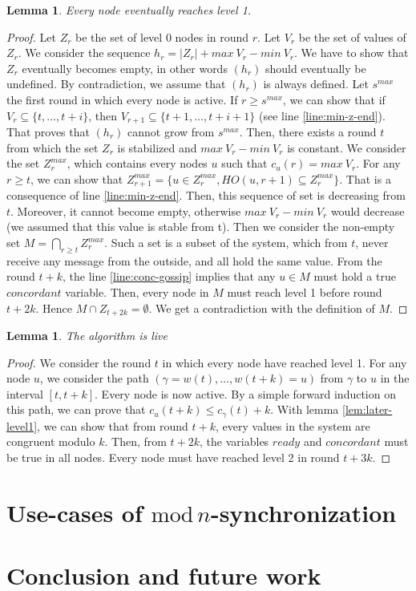 \documentclass[11pt,letterpaper]{article}
\renewcommand{\leq}{\leqslant}
\renewcommand{\geq}{\geqslant}
\newtheorem{lem}[thm]{Lemma}
\newcommand{\cent}{\gamma}
\begin{document}
\begin{lem}
	Every node eventually reaches level 1.
\end{lem}
\begin{proof}
	Let $Z_r$ be the set of level 0 nodes in round $r$.
	Let $V_r$ be the set of values of $Z_r$.
	We consider the sequence $h_r = |Z_r| + max~V_r - min~V_r$.
	We have to show that $Z_r$ eventually becomes empty, in other words $(h_r)$ should eventually be undefined.
	By contradiction, we assume that $(h_r)$ is always defined.
	Let $s^{max}$ the first round in which every node is active.
	If $r \geq s^{max}$, we can show that if $V_r \subseteq \{t, \dots, t+i\}$, then $V_{r+1} \subseteq \{t+1, \dots , t+i+1\}$ (see line \ref{line:min-z-end}).
	That proves that $(h_r)$ cannot grow from $s^{max}$.
	Then, there exists a round $t$ from which the set $Z_r$ is stabilized and $max~V_r - min~V_r$ is constant.
	We consider the set $Z_r^{max}$, which contains every nodes $u$ such that $c_u(r) = max~V_r$.
	For any $r \geq t$, we can show that $Z_{r+1}^{max} = \{u \in Z_r^{max}, HO(u, r+1) \subseteq Z_r^{max}\}$. That is a consequence of line \ref{line:min-z-end}.
	Then, this sequence of set is decreasing from $t$. Moreover, it cannot become empty, otherwise $max~V_r - min~V_r$ would decrease (we assumed that this value is stable from t).
	Then we consider the non-empty set $M = \bigcap\limits_{r \geq t} Z_r^{max}$.
	Such a set is a subset of the system, which from $t$, never receive any message from the outside, and all hold the same value.
	From the round $t+k$, the line \ref{line:conc-gossip} implies that any $u \in M$ must hold a true $concordant$ variable.
	Then, every node in $M$ must reach level 1 before round $t+2k$. Hence $M \cap Z_{t+2k} = \emptyset$.
	We get a contradiction with the definition of $M$.
\end{proof}

\begin{lem}
	The algorithm is live
\end{lem}
\begin{proof}
	We consider the round $t$ in which every node have reached level 1.
	For any node $u$, we consider the path $(\cent = w(t), \dots, w(t+k) = u)$ from $\cent$ to $u$ in the interval $[t, t+k]$.
	Every node is now active.
	By a simple forward induction on this path, we can prove that $c_u(t+k) \leq c_\cent(t)+k$.
	With lemma \ref{lem:later-level1}, we can show that from round $t+k$, every values in the system are congruent modulo $k$.
	Then, from $t+2k$, the variables $ready$ and $concordant$ must be true in all nodes.
	Every node must have reached level 2 in round $t+3k$.
\end{proof}

\section{Use-cases of $\mathrm{mod}\,n$-synchronization}

\section{Conclusion and future work}


\printbibliography
\end{document}
